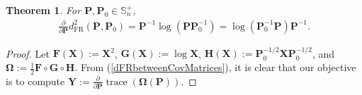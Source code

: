 \documentclass[letterpaper,10pt,twocolumn,conference]{ieeeconf}
\newtheorem{theorem}{Theorem}
\newcommand{\bbP}{{\bm{P}}}
\newcommand{\bbF}{\bm{F}}
\newcommand{\bbG}{\bm{G}}
\newcommand{\bbH}{\bm{H}}
\newcommand{\bbX}{\bm{X}}
\newcommand{\bbY}{\bm{Y}}
\newcommand{\bbOmega}{\bm{\Omega}}
\newcommand{\tr}{\operatorname{trace}}
\newcommand{\dFR}{d_{\mathrm{FR}}}
\begin{document}
\begin{theorem}\label{PartialofFisherRaoGeodesicLength}
	For $\bbP,\bbP_{0} \in \mathbb{S}_{n}^{+}$,
	\begin{align*}
		\displaystyle\frac{\partial}{\partial\bbP}\dFR^{2}(\bbP,\bbP_{0}) = \bbP^{-1}\log\left(\bbP\bbP_{0}^{-1}\right)= \log\left(\bbP_{0}^{-1}\bbP\right)\bbP^{-1}.
	\end{align*}
\end{theorem}
\begin{proof}
Let $\bbF(\bbX) := \bbX^{2}$, $\bbG(\bbX) := \log\bbX$, $\bbH(\bbX) := \bbP_{0}^{-1/2}\bbX\bbP_{0}^{-1/2}$, and $\bbOmega := \frac{1}{2}\bbF \circ \bbG \circ \bbH$. From (\ref{dFRbetweenCovMatrices}), it is clear that our objective is to compute $\bbY := \frac{\partial}{\partial\bbP}\tr\left(\bbOmega(\bbP)\right)$.


\end{proof}
\end{document}
